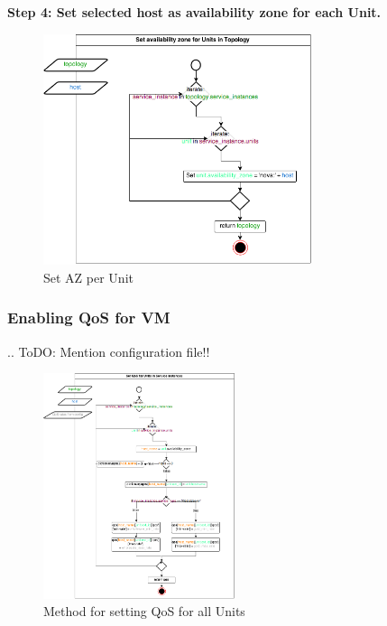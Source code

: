 \textbf{Step 4: Set selected host as availability zone for each Unit.}

\begin{figure}[H]
\centering

\includegraphics[width=0.7\textwidth]{images/design/cm_set_az_topology}

\caption{Set AZ per Unit}
\end{figure}

\subsubsection{Enabling QoS for VM}

.. ToDO: Mention configuration file!!

\begin{figure}[H]
\centering

\includegraphics[width=0.5\textwidth]{images/design/cm_set_qos.png}

\caption{Method for setting QoS for all Units}
\end{figure}


